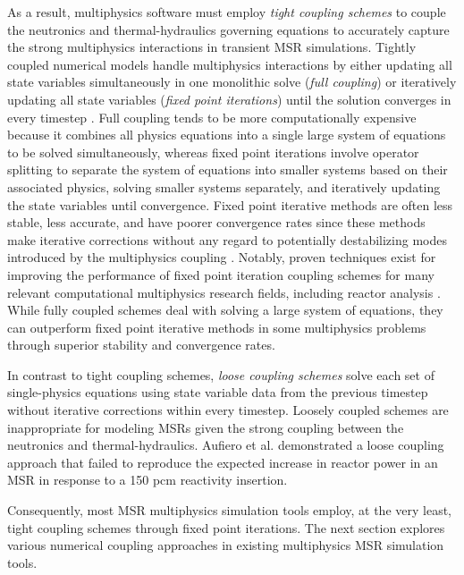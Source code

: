 As a result, multiphysics
software must employ \textit{tight coupling schemes} to couple the neutronics
and thermal-hydraulics governing equations to accurately capture the strong
multiphysics interactions in transient \gls{MSR} simulations. Tightly coupled
numerical models handle multiphysics interactions by either updating all state
variables simultaneously in one monolithic solve (\textit{full coupling}) or
iteratively updating all state variables (\textit{fixed point iterations})
until the solution converges in every timestep \cite{keyes_multiphysics_2013}.
Full coupling tends to be more computationally expensive because it combines
all physics equations into a single large system of equations to be solved
simultaneously, whereas fixed point iterations involve operator splitting to
separate the system of equations into smaller systems based on their associated
physics, solving smaller systems separately, and iteratively updating the state
variables until convergence. Fixed point iterative methods are often less
stable, less accurate, and have poorer
convergence rates since these methods make iterative corrections
without any regard to potentially destabilizing modes introduced by the
multiphysics coupling \cite{keyes_multiphysics_2013}. Notably, proven
techniques exist for improving the performance of fixed point iteration
coupling schemes for many relevant computational multiphysics research fields,
including reactor analysis \cite{ragusa_consistent_2009}. While fully coupled
schemes deal with solving a large system of equations, they can outperform
fixed point iterative methods in some multiphysics problems through superior
stability and convergence rates. 

In contrast to tight coupling schemes, \textit{loose coupling schemes}
solve each set of single-physics equations using state variable
data from the previous timestep without iterative corrections within every
timestep. Loosely coupled schemes are inappropriate for modeling \glspl{MSR}
given the strong coupling between the neutronics and thermal-hydraulics.
Aufiero et al. \cite{aufiero_development_2014} demonstrated a loose coupling
approach that failed to reproduce the expected increase in reactor power
in an \gls{MSR} in response to a 150 pcm reactivity insertion.

Consequently, most MSR multiphysics simulation tools employ, at
the very least, tight coupling schemes through fixed point iterations. The
next section explores various numerical coupling approaches in existing
multiphysics \gls{MSR} simulation tools.

